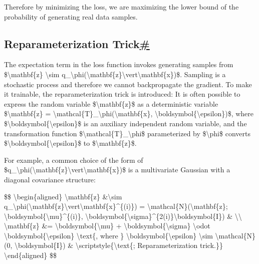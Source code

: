 Therefore by minimizing the loss, we are maximizing the lower bound of the probability of generating real data samples.

\subsection{\texorpdfstring{Reparameterization Trick\hyperref[reparameterization-trick]{\#}}{Reparameterization Trick\#}}\label{reparameterization-trick}

The expectation term in the loss function invokes generating samples from \$\textbackslash mathbf\{z\} \textbackslash sim q\_\textbackslash phi(\textbackslash mathbf\{z\}\textbackslash vert\textbackslash mathbf\{x\})\$. Sampling is a stochastic process and therefore we cannot backpropagate the gradient. To make it trainable, the reparameterization trick is introduced: It is often possible to express the random variable \$\textbackslash mathbf\{z\}\$ as a deterministic variable \$\textbackslash mathbf\{z\} = \textbackslash mathcal\{T\}\_\textbackslash phi(\textbackslash mathbf\{x\}, \textbackslash boldsymbol\{\textbackslash epsilon\})\$, where \$\textbackslash boldsymbol\{\textbackslash epsilon\}\$ is an auxiliary independent random variable, and the transformation function \$\textbackslash mathcal\{T\}\_\textbackslash phi\$ parameterized by \$\textbackslash phi\$ converts \$\textbackslash boldsymbol\{\textbackslash epsilon\}\$ to \$\textbackslash mathbf\{z\}\$.

For example, a common choice of the form of \$q\_\textbackslash phi(\textbackslash mathbf\{z\}\textbackslash vert\textbackslash mathbf\{x\})\$ is a multivariate Gaussian with a diagonal covariance structure:

\$\$ \textbackslash begin\{aligned\} \textbackslash mathbf\{z\} \&\textbackslash sim q\_\textbackslash phi(\textbackslash mathbf\{z\}\textbackslash vert\textbackslash mathbf\{x\}\^{}\{(i)\}) = \textbackslash mathcal\{N\}(\textbackslash mathbf\{z\}; \textbackslash boldsymbol\{\textbackslash mu\}\^{}\{(i)\}, \textbackslash boldsymbol\{\textbackslash sigma\}\^{}\{2(i)\}\textbackslash boldsymbol\{I\}) \& \textbackslash\textbackslash{} \textbackslash mathbf\{z\} \&= \textbackslash boldsymbol\{\textbackslash mu\} + \textbackslash boldsymbol\{\textbackslash sigma\} \textbackslash odot \textbackslash boldsymbol\{\textbackslash epsilon\} \textbackslash text\{, where \} \textbackslash boldsymbol\{\textbackslash epsilon\} \textbackslash sim \textbackslash mathcal\{N\}(0, \textbackslash boldsymbol\{I\}) \& \textbackslash scriptstyle\{\textbackslash text\{; Reparameterization trick.\}\} \textbackslash end\{aligned\} \$\$

